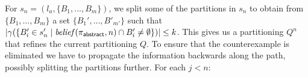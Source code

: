 For $s_n  =(l_a,\{B_1,\ldots,B_m\})$, we split some of the partitions in $s_n$ to obtain from $\{B_1,\ldots,B_m\}$ a set $\{B_1',\ldots, B'_{m'}\}$ such that $|\gamma(\{B_i' \in s_n' \mid \mathit{belief}(\pi_{\mathsf{abstract}}, n) \cap B_i' \neq \emptyset\})| \leq k$.
This gives us a partitioning $Q^n$ that refines the current partitioning $Q$. To ensure that the counterexample is eliminated we have to propagate the information backwards along the path, possibly splitting the partitions further. For each $j < n$:


